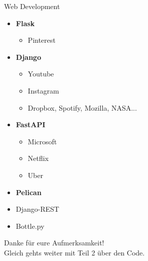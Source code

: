 \documentclass{beamer}
\begin{document}
\begin{frame}
\begin{center}
\begin{block}{Web Development}
\begin{itemize}
\pause
\item \textbf{Flask}
\pause
\begin{itemize}
\item Pinterest
\end{itemize}
\pause
\item \textbf{Django}
\pause
\begin{itemize}
\item Youtube
\item Instagram
\item Dropbox, Spotify, Mozilla, NASA...
\end{itemize}
\pause
\item \textbf{FastAPI}
\pause
\begin{itemize}
\item Microsoft
\item Netflix
\item Uber
\end{itemize}
\pause
\item \textbf{Pelican}
\pause
\item Django-REST
\item Bottle.py
\end{itemize}
\end{block}
\end{center}
\end{frame}

\begin{frame}
\begin{center}
{ \Huge Danke f\"ur eure Aufmerksamkeit!}\\
Gleich gehts weiter mit Teil 2 über den Code.
\end{center}
\end{frame}
\end{document}
